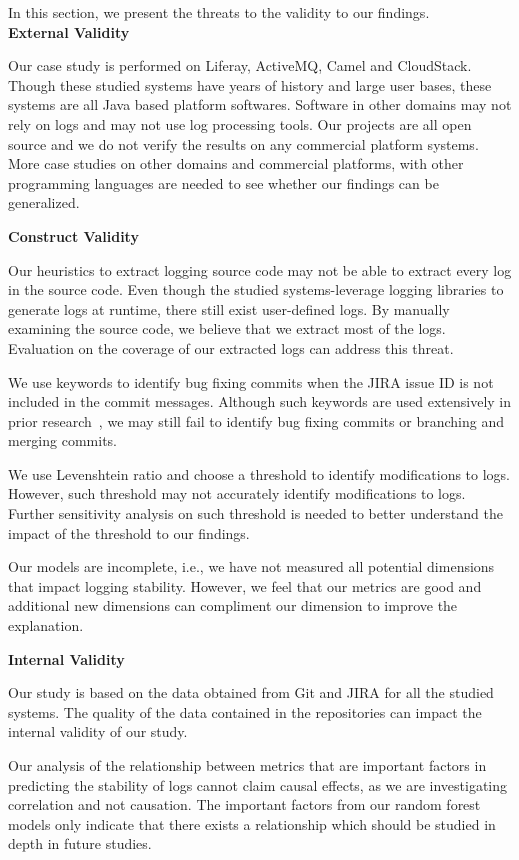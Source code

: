 In this section, we present the threats to the validity to our findings. \\


\noindent \textbf{External Validity}

Our case study is performed on Liferay, ActiveMQ, Camel and CloudStack. Though these studied systems have years of history and large user bases, these systems are all Java based platform softwares.  Software in other domains may not rely on logs and may not use log processing tools. Our projects are all open source and we do not verify the results on any commercial platform systems. More case studies on other domains and commercial platforms, with other programming languages are needed to see whether our findings can be generalized. 



\noindent \textbf{Construct Validity}


Our heuristics to extract logging source code may not be able to extract every log in the source code. Even though the studied systems-leverage logging libraries to generate logs at runtime, there still exist user-defined logs. By manually examining the source code, we believe that we extract most of the logs. Evaluation on the coverage of our extracted logs can address this threat.


We use keywords to identify bug fixing commits when the JIRA issue ID is not included in the commit messages. Although such keywords are used extensively in prior research~\cite{EMSEIAN}, we may still fail to identify bug fixing commits or branching and merging commits.

We use Levenshtein ratio and choose a threshold to identify modifications to logs. However, such threshold may not accurately identify modifications to logs. Further sensitivity analysis on such threshold is needed to better understand the impact of the threshold to our findings.

Our models are incomplete, i.e., we have not measured all potential dimensions that impact logging stability. However, we feel that our metrics are good and additional new dimensions can compliment our dimension to improve the explanation. 

\noindent \textbf{Internal Validity}

Our study is based on the data obtained from Git and JIRA for all the studied systems. The quality of the data contained in the repositories can impact the internal validity of our study.

Our analysis of the relationship between metrics that are important factors in predicting the stability of logs cannot claim causal effects, as we are investigating correlation and not causation. The important factors from our random forest models only indicate that there exists a relationship which should be studied in depth in future studies. 



